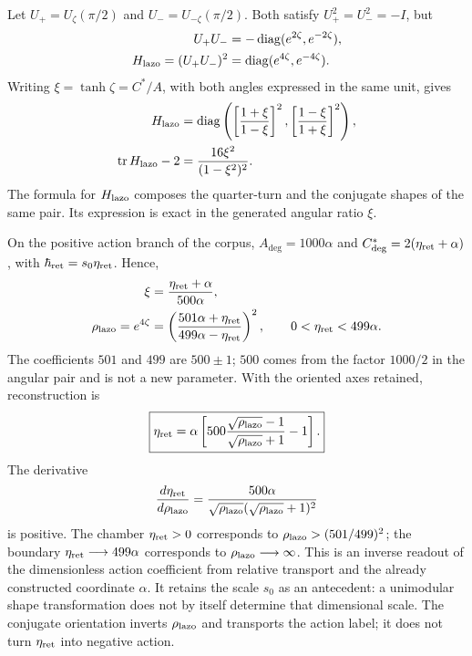 Let \(U_+=U_\zeta(\pi/2)\) and
\(U_-=U_{-\zeta}(\pi/2)\). Both satisfy
\(U_+^2=U_-^2=-I\), but
\begin{equation}
 \begin{aligned}
 U_+U_-&=-\operatorname{diag}(e^{2\zeta},e^{-2\zeta}),\\
 H_{\rm lazo}=(U_+U_-)^2
 &=\operatorname{diag}(e^{4\zeta},e^{-4\zeta}).
 \end{aligned}
 \label{md:comp:lazo-diagonal}
\end{equation}
Writing \(\xi=\tanh\zeta=C^*/A\), with both angles expressed in the
same unit, gives
\begin{equation}
 \begin{aligned}
 H_{\rm lazo}
 &=\operatorname{diag}\left(
 \left[\frac{1+\xi}{1-\xi}\right]^2,
 \left[\frac{1-\xi}{1+\xi}\right]^2\right),\\
 \operatorname{tr}H_{\rm lazo}-2
 &=\frac{16\xi^2}{(1-\xi^2)^2}.
 \end{aligned}
 \label{md:comp:lazo-razon-angular}
\end{equation}
The formula for \(H_{\rm lazo}\) composes the quarter-turn and the
conjugate shapes of the same pair. Its expression is exact in the
generated angular ratio \(\xi\).

On the positive action branch of the corpus,
\(A_{\deg}=1000\alpha\) and
\(C^*_{\deg}=2(\eta_{\rm ret}+\alpha)\), with
\(\hbar_{\rm ret}=s_0\eta_{\rm ret}\). Hence,
\begin{equation}
 \begin{aligned}
 \xi&=\frac{\eta_{\rm ret}+\alpha}{500\alpha},\\
 \rho_{\rm lazo}=e^{4\zeta}
 &=\left(\frac{501\alpha+\eta_{\rm ret}}
                 {499\alpha-\eta_{\rm ret}}\right)^2,
 \qquad 0<\eta_{\rm ret}<499\alpha.
 \end{aligned}
 \label{md:comp:multiplicador-lazo}
\end{equation}
The coefficients \(501\) and \(499\) are \(500\pm1\);
\(500\) comes from the factor \(1000/2\) in the angular pair and is
not a new parameter. With the oriented axes retained, reconstruction is
\begin{equation}
 \boxed{
 \eta_{\rm ret}=\alpha\left[
 500\frac{\sqrt{\rho_{\rm lazo}}-1}
          {\sqrt{\rho_{\rm lazo}}+1}-1\right].}
 \label{md:comp:restitucion-accion}
\end{equation}
The derivative
\[
 \frac{d\eta_{\rm ret}}{d\rho_{\rm lazo}}
 =\frac{500\alpha}
 {\sqrt{\rho_{\rm lazo}}(\sqrt{\rho_{\rm lazo}}+1)^2}
\]
is positive. The chamber \(\eta_{\rm ret}>0\) corresponds to
\(\rho_{\rm lazo}>(501/499)^2\); the boundary
\(\eta_{\rm ret}\longrightarrow499\alpha\) corresponds to
\(\rho_{\rm lazo}\longrightarrow\infty\).
This is an inverse readout of the dimensionless action coefficient
from relative transport and the already constructed coordinate
\(\alpha\). It retains the scale \(s_0\) as an antecedent: a
unimodular shape transformation does not by itself determine that
dimensional scale. The conjugate orientation inverts \(\rho_{\rm lazo}\)
and transports the action label; it does not turn
\(\eta_{\rm ret}\) into negative action.

